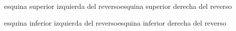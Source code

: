 \documentclass[
sinencabezadofactura,
filas, %
divisa,
vencimiento,
csv, %
]{factura}
\begin{document}
\begin{factura}
\end{factura}


\begin{reverso}
esquina superior izquierda del reverso\hfill esquina superior derecha del reverso\par
\vfill
esquina inferior izquierda del reverso\hfill esquina inferior derecha del reverso
\end{reverso}

\Ejemplo
\end{document}
